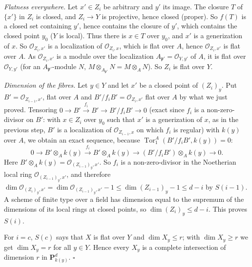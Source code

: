 \documentclass[11pt]{article}
\begin{document}
\emph{Flatness everywhere.} Let $x'\in Z_i$ be arbitrary and $y'$ its image. The closure $T$ of $\{x'\}$ in $Z_i$ is closed, and $Z_i\to Y$ is projective, hence closed (proper). So $f(T)$ is a closed set containing $y'$, hence contains the closure of $y'$, which contains the closed point $y_0$ ($Y$ is local). Thus there is $x\in T$ over $y_0$, and $x'$ is a generization of $x$. So $\mathcal O_{Z_i,x'}$ is a localization of $\mathcal O_{Z_i,x}$, which is flat over $A$, hence $\mathcal O_{Z_i,x'}$ is flat over $A$. As $\mathcal O_{Z_i,x'}$ is a module over the localization $A_{\mathfrak p'}=\mathcal O_{Y,y'}$ of $A$, it is flat over $\mathcal O_{Y,y'}$ (for an $A_{\mathfrak p'}$-module $N$, $M\otimes_{A_{\mathfrak p'}}N=M\otimes_AN$). So $Z_i$ is flat over $Y$.

\emph{Dimension of the fibres.} Let $y\in Y$ and let $x'$ be a closed point of $(Z_i)_y$. Put $B'=\mathcal O_{Z_{i-1},x'}$, flat over $A$ and $B'/f_iB'=\mathcal O_{Z_i,x'}$ flat over $A$ by what we just proved. Tensoring $0\to B'\xrightarrow{f_i}B'\to B'/f_iB'\to0$ (exact since $f_i$ is a non-zero-divisor on $B'$: with $x\in Z_i$ over $y_0$ such that $x'$ is a generization of $x$, as in the previous step, $B'$ is a localization of $\mathcal O_{Z_{i-1},x}$ on which $f_i$ is regular) with $k(y)$ over $A$, we obtain an exact sequence, because $\operatorname{Tor}_1^A(B'/f_iB',k(y))=0$:
\[ 0\to B'\otimes_Ak(y)\xrightarrow{\,f_i\,}B'\otimes_Ak(y)\to(B'/f_iB')\otimes_Ak(y)\to0. \]
Here $B'\otimes_Ak(y)=\mathcal O_{(Z_{i-1})_y,x'}$. So $f_i$ is a non-zero-divisor in the Noetherian local ring $\mathcal O_{(Z_{i-1})_y,x'}$, and therefore $\dim\mathcal O_{(Z_i)_y,x'}=\dim\mathcal O_{(Z_{i-1})_y,x'}-1\le\dim(Z_{i-1})_y-1\le d-i$ by $S(i-1)$. A scheme of finite type over a field has dimension equal to the supremum of the dimensions of its local rings at closed points, so $\dim(Z_i)_y\le d-i$. This proves $S(i)$.

For $i=c$, $S(c)$ says that $X$ is flat over $Y$ and $\dim X_y\le r$; with $\dim X_y\ge r$ we get $\dim X_y=r$ for all $y\in Y$. Hence every $X_y$ is a complete intersection of dimension $r$ in $\mathbf P^d_{k(y)}$. \hfill$\square$
\end{document}
